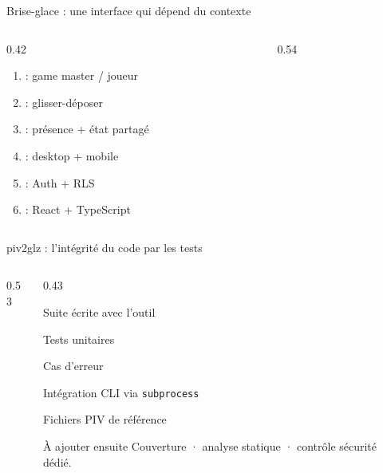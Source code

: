 \begin{frame}{Brise-glace : une interface qui dépend du contexte}
\begin{columns}[T]
\begin{column}{0.42\linewidth}
\small
\begin{enumerate}
  \item {} : game master / joueur
  \item {} : glisser-déposer
  \item {} : présence + état partagé
  \item {} : desktop + mobile
  \item {} : Auth + RLS
  \item {} : React + TypeScript
\end{enumerate}
\end{column}
\begin{column}{0.54\linewidth}
\centering
{}\\[0.3em]
\end{column}
\end{columns}
\end{frame}

\begin{frame}{piv2glz : l'intégrité du code par les tests}
\begin{columns}[T]
\begin{column}{0.53\linewidth}
\centering
{}
\end{column}
\begin{column}{0.43\linewidth}
\begin{block}{Suite écrite avec l'outil}
\small
\begin{tightitems}
  \item Tests unitaires
  \item Cas d'erreur
  \item Intégration CLI via \texttt{subprocess}
  \item Fichiers PIV de référence
\end{tightitems}
\end{block}
\begin{block}{À ajouter ensuite}
\small Couverture · analyse statique · contrôle sécurité dédié.
\end{block}
\vspace{0.2em}
\small{}
\end{column}
\end{columns}
\end{frame}

